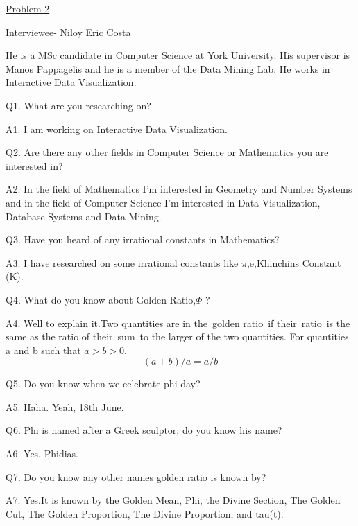 \hspace{4.5cm}   \underline{Problem 2}

\hspace{3.2cm}      Interviewee- Niloy Eric Costa \newline

He is a MSc candidate in Computer Science at York University. His supervisor is Manos Pappagelis and he is a member of the Data Mining Lab. He works in Interactive Data Visualization.\newline

Q1. What are you researching on?


A1. I am working on Interactive Data Visualization.\newline

Q2. Are there any other fields in Computer Science or Mathematics you are interested in?

A2. In the field of Mathematics I'm interested in Geometry and Number Systems and in the field of Computer Science I'm interested in Data Visualization, Database Systems and Data Mining.
\newline 


Q3. Have you heard of any irrational constants in Mathematics? 


A3. I have researched on some irrational constants like $\pi$,e,Khinchins Constant (K).
\newline

     Q4. What do you know about Golden Ratio,$\Phi$ ?
     
     
     A4. Well to explain it.Two quantities are in the golden ratio if their ratio is the same as the ratio of their sum to the
larger of the two quantities. For quantities a and b such that $a > b > 0$,
$$(a+b)/a =a/b$$
     \newline

    Q5. Do you know when we celebrate phi day?
    
    
    A5. Haha. Yeah, 18th June.
    \newline
    
    Q6. Phi is named after a Greek sculptor; do you know his name?
    
    
    A6. Yes, Phidias.
    \newline

   Q7. Do you know any other names golden ratio is known by?
   
   
   A7. Yes.It is known by the Golden Mean, Phi, the Divine Section, The Golden Cut, The Golden Proportion, The Divine Proportion, and tau(t).
   \newline
   
